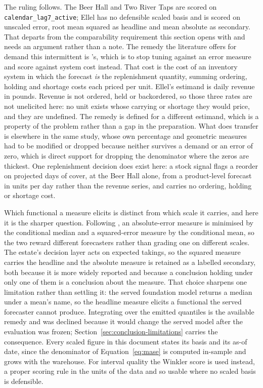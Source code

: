 \label{sec:ruler-ellel}
The ruling follows. The Beer Hall and Two River Taps are scored on
\texttt{calendar\_lag7\_active}; Ellel has no defensible scaled basis and is scored on unscaled
error, root mean squared as headline and mean absolute as secondary. That departs from the
comparability requirement this section opens with and needs an argument rather than a note. The
remedy the literature offers for demand this intermittent is
\citet{chatfield_all-zero_2007}'s, which is to stop tuning against an error measure and score
against system cost instead. That cost is the cost of an inventory system in which the forecast
\emph{is} the replenishment quantity, summing ordering, holding and shortage costs each priced
per unit. Ellel's estimand is daily revenue in pounds. Revenue is not ordered, held or
backordered, so those three rates are not unelicited here: no unit exists whose carrying or
shortage they would price, and they are undefined. The remedy is defined for a different
estimand, which is a property of the problem rather than a gap in the preparation. What does
transfer is elsewhere in the same study, whose own percentage and geometric measures had to be
modified or dropped because neither survives a demand or an error of zero, which is direct
support for dropping the denominator where the zeros are thickest. One replenishment decision does
exist
here: a stock signal flags a reorder on projected days of cover, at the Beer Hall alone, from a
product-level forecast in units per day rather than the revenue series, and carries no ordering,
holding or shortage cost.

\label{sec:ruler-functional}
Which functional a measure elicits is distinct from which scale it carries, and here it is the
sharper question. Following \citet{kolassa_we_2023}, an absolute-error measure is minimised by the
conditional median and a squared-error measure by the conditional mean, so the two reward
different forecasters rather than grading one on different scales. The estate's decision layer
acts on expected takings, so the squared measure carries the headline and the absolute measure is
retained as a labelled secondary, both because it is more widely reported and because a conclusion
holding under only one of them is a conclusion about the measure. That choice sharpens one
limitation rather than settling it: the served foundation model returns a median under a mean's
name, so the headline measure elicits a functional the served forecaster cannot produce.
Integrating over the emitted quantiles is the available remedy and was declined because it would
change the served model after the evaluation was frozen;
Section~\ref{sec:conclusion-limitations} carries the consequence. Every scaled figure in this
document states its basis and its as-of date, since the denominator of Equation~\ref{eq:mase} is
computed in-sample and grows with the warehouse. For interval quality the Winkler score is used
instead, a proper scoring rule in the units of the data and so usable where no scaled basis is
defensible.

